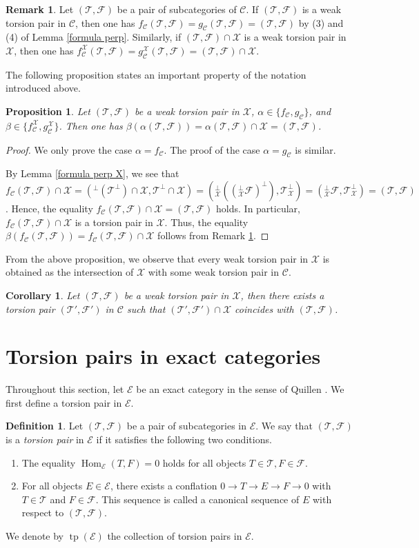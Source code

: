 \documentclass{amsart}
\newtheorem{cor}[thm]{Corollary}
\newtheorem{prop}[thm]{Proposition}
\theoremstyle{definition}
\newtheorem{dfn}[thm]{Definition}
\newtheorem{rem}[thm]{Remark}
\theoremstyle{remark}
\def\C{\mathcal{C}}
\def\E{\mathcal{E}}
\def\F{\mathcal{F}}
\def\Hom{\operatorname{Hom}}
\def\T{\mathcal{T}}
\def\tp{\operatorname{tp}}
\def\X{\mathcal{X}}
\begin{document}
\begin{rem}\label{rem fg}
Let $(\T,\F)$ be a pair of subcategories of $\C$. If $(\T,\F)$ is a weak torsion pair in $\C$, then one has $f_\C(\T,\F)=g_\C(\T,\F)=(\T,\F)$ by (3) and (4) of Lemma \ref{formula perp}. Similarly, if $(\T,\F)\cap\X$ is a weak torsion pair in $\X$, then one has $f^\X_\C(\T,\F)=g^\X_\C(\T,\F)=(\T,\F)\cap\X$.
\end{rem}

The following proposition states an important property of the notation introduced above.

\begin{prop}\label{prop wtp subcat}
Let $(\T,\F)$ be a weak torsion pair in $\X$, $\alpha\in\{f_\C,g_\C\}$, and $\beta\in\{f^\X_\C,g^\X_\C\}$. Then one has $\beta(\alpha(\T,\F))=\alpha(\T,\F)\cap\X=(\T,\F)$.
\end{prop}

\begin{proof}
We only prove the case $\alpha=f_\C$. The proof of the case $\alpha=g_\C$ is similar.

By Lemma \ref{formula perp X}, we see that $f_\C(\T,\F)\cap\X=(^\perp(\T^\perp)\cap\X,\T^\perp\cap\X)=(^\perp_\X((^\perp_\X\F)^\perp),\T^\perp_\X)=(^\perp_\X\F,\T^\perp_\X)=(\T,\F)$. Hence, the equality $f_\C (\T,\F)\cap \X=(\T,\F)$ holds. In particular, $f_\C(\T,\F)\cap\X$ is a torsion pair in $\X$. Thus, the equality $\beta(f_\C(\T,\F))=f_\C(\T,\F)\cap\X$ follows from Remark \ref{rem fg}.
\end{proof}

From the above proposition, we observe that every weak torsion pair in $\X$ is obtained as the intersection of $\X$ with some weak torsion pair in $\C$.

\begin{cor}\label{cor wtp restrict}
Let $(\T,\F)$ be a weak torsion pair in $\X$, then there exists a torsion pair $(\T',\F')$ in $\C$ such that $(\T',\F')\cap\X$ coincides with $(\T,\F)$.
\end{cor}

\section{Torsion pairs in exact categories}

Throughout this section, let $\E$ be an exact category in the sense of Quillen \cite{Q}. We first define a torsion pair in $\E$.

\begin{dfn}
Let $(\T,\F)$ be a pair of subcategories in $\E$. 
We say that $(\T,\F)$ is a {\em torsion pair} in $\E$ if it satisfies the following two conditions.
\begin{enumerate}[\rm(1)]
\item 
The equality $\Hom_\E(T,F)=0$ holds for all objects $T\in\T,F\in\F$.
\item
For all objects $E\in\E$, there exists a conflation $0\to T\to E\to F\to0$ with $T\in\T$ and $F\in\F$. This sequence is called a canonical sequence of $E$ with respect to $(\T,\F)$.
\end{enumerate}
We denote by $\tp(\E)$ the collection of torsion pairs in $\E$.
\end{dfn}
\end{document}
